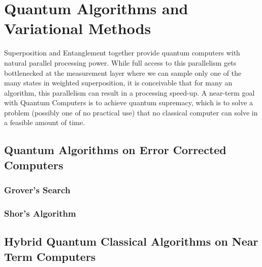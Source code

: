 \chapter{Quantum Algorithms and Variational Methods}

Superposition and Entanglement together provide quantum computers with natural parallel processing power. While full access to this parallelism gets bottlenecked at the measurement layer where we can sample only one of the many states in weighted superposition, it is conceivable that for many an algorithm, this parallelism can result in a processing speed-up. A near-term goal with Quantum Computers is to achieve quantum supremacy, which is to solve a problem (possibly one of no practical use) that no classical computer can solve in a feasible amount of time. \cite{quantum-complexity-survey}


\section{Quantum Algorithms on Error Corrected Computers}

\subsection{Grover's Search}



\subsection{Shor's Algorithm}



\section{Hybrid Quantum Classical Algorithms on Near Term Computers}


